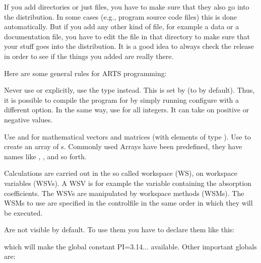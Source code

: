 
If you add directories or just files, you have to make sure that they
also go into the distribution. In some cases (e.g., program source
code files) this is done automatically. But if you add any other kind
of file, for example a data or a documentation file, you have to edit
the  file in that directory to make sure that your
stuff goes into the distribution. It is a good idea to always check
the release in order to see if the things you added are really there.

\label{sec:development:conv}

Here are some general rules for ARTS programming:

\levelc{} Never use  or  explicitly, use the
type  instead.  This is set by  (to
 by default). Thus, it is possible to compile the program
for  by simply running configure with a different option.
%
%
In the same way, use  for all integers. It can take on positive
or negative values.

\levelc{} Use  and  for mathematical vectors
and matrices (with elements of type ). Use
 to create an array of s. Commonly
used Arrays have been predefined, they have names like
, , and so forth.

Calculations are carried out in the so called workspace (WS), on
workspace variables (WSVs). A WSV is for example the variable
containing the absorption coefficients. The WSVs are manipulated by 
workspace methods (WSMs). The WSMs to use are specified in the
controlfile in the same order in which they will be
executed. 

   Are not visible by default. To use them you have to declare them
   like this:
   \begin{quote}
   \end{quote}
   which will make the global constant PI=3.14... available. Other important globals are:

